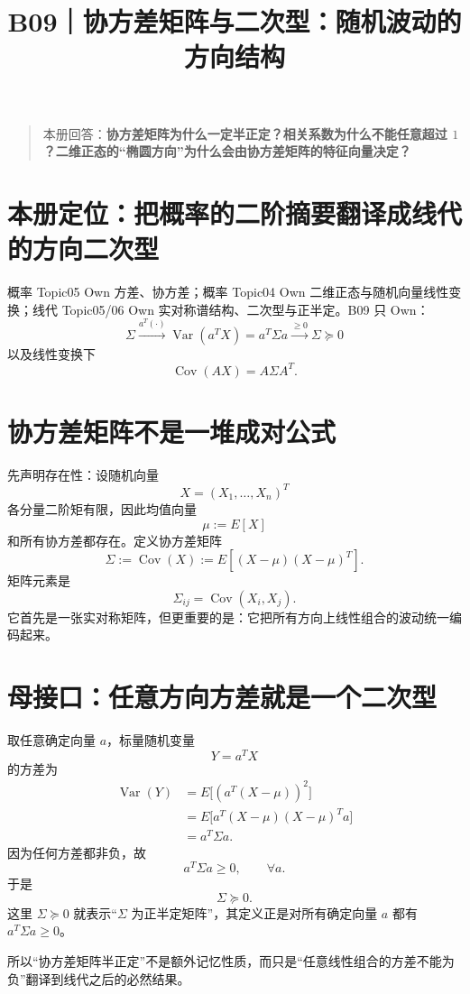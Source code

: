 \documentclass[profile=standard]{ipara-handbook}
\title{B09｜协方差矩阵与二次型：随机波动的方向结构}
\author{}
\date{}
\begin{document}
\maketitle

\begin{quote}
本册回答：\textbf{协方差矩阵为什么一定半正定？相关系数为什么不能任意超过 $1$？二维正态的“椭圆方向”为什么会由协方差矩阵的特征向量决定？}
\end{quote}

\section{本册定位：把概率的二阶摘要翻译成线代的方向二次型}
概率 Topic05 Own 方差、协方差；概率 Topic04 Own 二维正态与随机向量线性变换；线代 Topic05/06 Own 实对称谱结构、二次型与正半定。B09 只 Own：
\[
\boxed{
\Sigma
\xrightarrow{a^T(\cdot)}
\operatorname{Var}(a^TX)=a^T\Sigma a
\xrightarrow{\ge0}
\Sigma\succeq0
}
\]
以及线性变换下
\[
\boxed{\operatorname{Cov}(AX)=A\Sigma A^T.}
\]

\section{协方差矩阵不是一堆成对公式}
先声明存在性：设随机向量
\[
X=(X_1,\dots,X_n)^T
\]
各分量二阶矩有限，因此均值向量
\[
\mu:=E[X]
\]
和所有协方差都存在。定义协方差矩阵
\[
\Sigma:=\operatorname{Cov}(X):=E[(X-\mu)(X-\mu)^T].
\]
矩阵元素是
\[
\Sigma_{ij}=\operatorname{Cov}(X_i,X_j).
\]
它首先是一张实对称矩阵，但更重要的是：它把所有方向上线性组合的波动统一编码起来。

\section{母接口：任意方向方差就是一个二次型}
取任意确定向量 $a$，标量随机变量
\[
Y=a^TX
\]
的方差为
\[
\begin{aligned}
\operatorname{Var}(Y)
&=E\bigl[(a^T(X-\mu))^2\bigr]\\
&=E\bigl[a^T(X-\mu)(X-\mu)^Ta\bigr]\\
&=a^T\Sigma a.
\end{aligned}
\]
因为任何方差都非负，故
\[
\boxed{a^T\Sigma a\ge0,\qquad \forall a.}
\]
于是
\[
\boxed{\Sigma\succeq0.}
\]
这里 $\Sigma\succeq0$ 就表示“$\Sigma$ 为正半定矩阵”，其定义正是对所有确定向量 $a$ 都有 $a^T\Sigma a\ge0$。

所以“协方差矩阵半正定”不是额外记忆性质，而只是“任意线性组合的方差不能为负”翻译到线代之后的必然结果。
\end{document}
